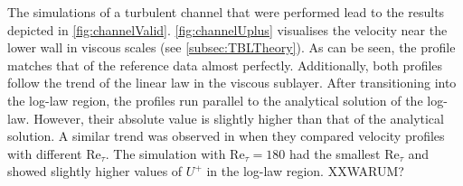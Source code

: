 The simulations of a turbulent channel that were performed lead to the results depicted in \autoref{fig:channelValid}.
\autoref{fig:channelUplus} visualises the velocity near the lower wall in viscous scales (see \autoref{subsec:TBLTheory}).
As can be seen, the profile matches that of the reference data almost perfectly.
Additionally, both profiles follow the trend of the linear law in the viscous sublayer. 
After transitioning into the log-law region, the profiles run parallel to the analytical solution of the log-law.
However, their absolute value is slightly higher than that of the analytical solution.
A similar trend was observed in \citep{lee_direct_2015} when they compared velocity profiles with different $\mathrm{Re}_{\tau}$.
The simulation with $\mathrm{Re}_{\tau} = 180$ had the smallest $\mathrm{Re}_{\tau}$ and showed slightly higher values of $U^+$ in the log-law region.
XXWARUM?


